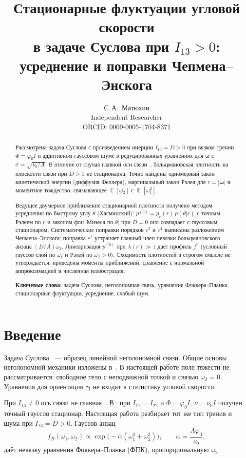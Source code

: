 \documentclass[12pt,a4paper]{article}
\title{%
  Стационарные флуктуации угловой скорости\\[0.3em]
  в задаче Суслова при $I_{13}>0$:\\
  усреднение и поправки Чепмена--Энскога
}
\author{%
  С.\,А.~Матюхин\\[0.2em]
  \small Independent Researcher\\
  \small ORCID: 0009-0005-1704-8371
}
\date{}
\DeclareMathOperator{\E}{\mathbb{E}}
\newcommand{\phiz}{\varphi_0}
\newcommand{\nuz}{\nu_0}
\begin{document}
\maketitle

\begin{abstract}
Рассмотрена задача Суслова с произведением инерции $I_{13}=D>0$ при вязком трении
$\Phi=\phiz I$ и аддитивном гауссовом шуме в редуцированных уравнениях для $\bm{\omega}$
с $\sigma=\sqrt{\nuz/A}$. В отличие от случая главной оси связи~\cite{MatSin1996}, больцмановская
плотность на плоскости связи при $D>0$ не стационарна. Точно найдены одномерный закон
кинетической энергии (диффузия Феллера), маргинальный закон Рэлея для $r=|\bm{\omega}|$
и моментное тождество, связывающее $\E[\omega_2]$ с $\E[\omega_1^2]$.

Ведущее двумерное приближение стационарной плотности получено методом усреднения по быстрому
углу $\theta$ (Хасминский): $p^{(0)}=p_r(r)\,p(\theta|r)$ с точным Рэлеем по $r$ и законом
фон~Мизеса по $\theta$; при $D=0$ оно совпадает с гауссовым стационаром. Систематические
поправки порядков $\varepsilon^2$ и $\varepsilon^4$ выписаны разложением Чепмена--Энскога;
поправка $\varepsilon^2$ устраняет главный член невязки больцмановского анзаца $(D/A)\omega_2$.
Линеаризация $p^{(0)}$ при $\lambda(r)\gg1$ даёт профиль $f^*$ (условный гауссов слой по
$\omega_1$ и Рэлей по $\omega_2>0$). Сходимость плотностей в строгом смысле не утверждается;
приведены моменты приближений, сравнение с нормальной аппроксимацией и численная иллюстрация.

\medskip
\noindent\textbf{Ключевые слова:} задача Суслова, неголономная связь, уравнение Фоккера--Планка,
стационарные флуктуации, усреднение, слабый шум.
\end{abstract}

\section{Введение}

Задача Суслова~\cite{Suslov1946,BorisovMamaev2001} --- образец линейной неголономной связи.
Общие основы неголономной механики изложены в~\cite{Bloch2003}. В настоящей работе поле
тяжести не рассматривается: свободное тело с неподвижной точкой и связью $\omega_3=0$.
Уравнения для ориентации $\bm{\gamma}$ не входят в статистику угловой скорости.

При $I_{13}\neq0$ ось связи не главная~\cite{Kozlov1985,Fedorov2009}. В~\cite{MatSin1996}
при $I_{11}=I_{22}$ и $\Phi=\phiz I$, $\nu=\nuz I$ получен точный гауссов стационар.
Настоящая работа разбирает тот же тип трения и шума при $I_{13}=D>0$. Гауссов анзац
\begin{equation}\label{eq:gauss}
  f_B(\omega_1,\omega_2)\propto\exp\bigl(-\alpha(\omega_1^2+\omega_2^2)\bigr),
  \qquad \alpha=\frac{A\phiz}{\nuz},
\end{equation}
даёт невязку уравнения Фоккера--Планка (ФПК), пропорциональную $\omega_2$.
\end{document}
